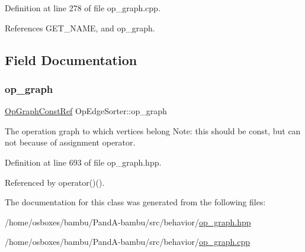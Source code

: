 Definition at line 278 of file op\+\_\+graph.\+cpp.



References G\+E\+T\+\_\+\+N\+A\+ME, and op\+\_\+graph.



\subsection{Field Documentation}
\mbox{\label{classOpEdgeSorter_aaf40cdea9ead8a08f452e6cf6294ed7d}} 
\subsubsection{\texorpdfstring{op\+\_\+graph}{op\_graph}}
{\footnotesize\ttfamily \hyperlink{op__graph_8hpp_a9a0b240622c47584bee6951a6f5de746}{Op\+Graph\+Const\+Ref} Op\+Edge\+Sorter\+::op\+\_\+graph\hspace{0.3cm}{\ttfamily [private]}}



The operation graph to which vertices belong Note\+: this should be const, but can not because of assignment operator. 



Definition at line 693 of file op\+\_\+graph.\+hpp.



Referenced by operator()().



The documentation for this class was generated from the following files\+:\begin{DoxyCompactItemize}
\item 
/home/osboxes/bambu/\+Pand\+A-\/bambu/src/behavior/\hyperlink{op__graph_8hpp}{op\+\_\+graph.\+hpp}\item 
/home/osboxes/bambu/\+Pand\+A-\/bambu/src/behavior/\hyperlink{op__graph_8cpp}{op\+\_\+graph.\+cpp}\end{DoxyCompactItemize}
